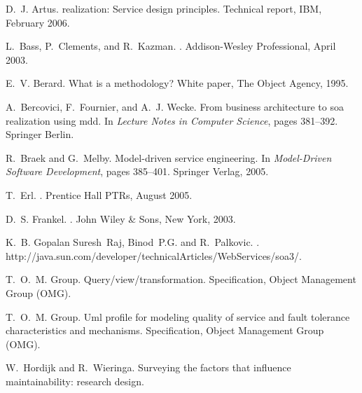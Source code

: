 \documentclass{IOS-Book-Article}
\begin{document}
\begin{thebibliography}{10}

D.~J. Artus.
 realization: Service design principles.
\newblock Technical report, IBM, February 2006.

L.~Bass, P.~Clements, and R.~Kazman.
.
\newblock Addison-Wesley Professional, April 2003.

E.~V. Berard.
\newblock What is a methodology?
\newblock White paper, The Object Agency, 1995.

A.~Bercovici, F.~Fournier, and A.~J. Wecke.
\newblock From business architecture to soa realization using mdd.
\newblock In {\em Lecture Notes in Computer Science}, pages 381--392. Springer
  Berlin.

R.~Braek and G.~Melby.
\newblock Model-driven service engineering.
\newblock In {\em Model-Driven Software Development}, pages 385--401. Springer
  Verlag, 2005.

T.~Erl.
.
\newblock Prentice Hall PTRs, August 2005.

D.~S. Frankel.
.
\newblock John Wiley \& Sons, New York, 2003.

K.~B. Gopalan Suresh~Raj, Binod~P.G. and R.~Palkovic.
.
\newblock http://java.sun.com/developer/technicalArticles/WebServices/soa3/.

T.~O.~M. Group.
\newblock Query/view/transformation.
\newblock Specification, Object Management Group (OMG).

T.~O.~M. Group.
\newblock Uml profile for modeling quality of service and fault tolerance
  characteristics and mechanisms.
\newblock Specification, Object Management Group (OMG).

W.~Hordijk and R.~Wieringa.
\newblock Surveying the factors that influence maintainability: research
  design.


\end{thebibliography}
\end{document}
